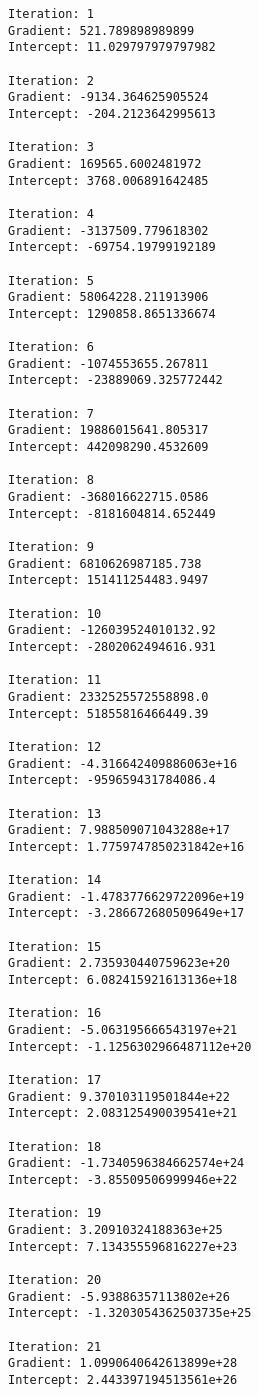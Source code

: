 \documentclass[11pt]{article}
\begin{document}
    \begin{Verbatim}[commandchars=\\\{\}]
Iteration: 1 
Gradient: 521.789898989899 
Intercept: 11.029797979797982 

Iteration: 2 
Gradient: -9134.364625905524 
Intercept: -204.2123642995613 

Iteration: 3 
Gradient: 169565.6002481972 
Intercept: 3768.006891642485 

Iteration: 4 
Gradient: -3137509.779618302 
Intercept: -69754.19799192189 

Iteration: 5 
Gradient: 58064228.211913906 
Intercept: 1290858.8651336674 

Iteration: 6 
Gradient: -1074553655.267811 
Intercept: -23889069.325772442 

Iteration: 7 
Gradient: 19886015641.805317 
Intercept: 442098290.4532609 

Iteration: 8 
Gradient: -368016622715.0586 
Intercept: -8181604814.652449 

Iteration: 9 
Gradient: 6810626987185.738 
Intercept: 151411254483.9497 

Iteration: 10 
Gradient: -126039524010132.92 
Intercept: -2802062494616.931 

Iteration: 11 
Gradient: 2332525572558898.0 
Intercept: 51855816466449.39 

Iteration: 12 
Gradient: -4.316642409886063e+16 
Intercept: -959659431784086.4 

Iteration: 13 
Gradient: 7.988509071043288e+17 
Intercept: 1.7759747850231842e+16 

Iteration: 14 
Gradient: -1.4783776629722096e+19 
Intercept: -3.286672680509649e+17 

Iteration: 15 
Gradient: 2.735930440759623e+20 
Intercept: 6.082415921613136e+18 

Iteration: 16 
Gradient: -5.063195666543197e+21 
Intercept: -1.1256302966487112e+20 

Iteration: 17 
Gradient: 9.370103119501844e+22 
Intercept: 2.083125490039541e+21 

Iteration: 18 
Gradient: -1.7340596384662574e+24 
Intercept: -3.85509506999946e+22 

Iteration: 19 
Gradient: 3.20910324188363e+25 
Intercept: 7.134355596816227e+23 

Iteration: 20 
Gradient: -5.93886357113802e+26 
Intercept: -1.3203054362503735e+25 

Iteration: 21 
Gradient: 1.0990640642613899e+28 
Intercept: 2.443397194513561e+26 


\end{Verbatim}
\end{document}
